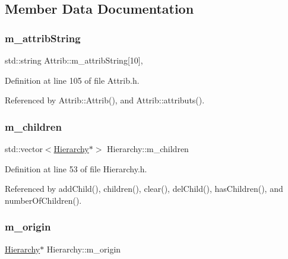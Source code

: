 \subsection{Member Data Documentation}
\mbox{\label{classAttrib_a3414521d7a82476e874b25a5407b5e63}} 
\subsubsection{\texorpdfstring{m\+\_\+attrib\+String}{m\_attribString}}
{\footnotesize\ttfamily std\+::string Attrib\+::m\+\_\+attrib\+String\mbox{[}10\mbox{]}\hspace{0.3cm}{\ttfamily [protected]}, {\ttfamily [inherited]}}



Definition at line 105 of file Attrib.\+h.



Referenced by Attrib\+::\+Attrib(), and Attrib\+::attributs().

\mbox{\label{classHierarchy_a038816763941fd4a930504917f60483b}} 
\subsubsection{\texorpdfstring{m\+\_\+children}{m\_children}}
{\footnotesize\ttfamily std\+::vector$<$\hyperlink{classHierarchy}{Hierarchy}$\ast$$>$ Hierarchy\+::m\+\_\+children\hspace{0.3cm}{\ttfamily [private]}}



Definition at line 53 of file Hierarchy.\+h.



Referenced by add\+Child(), children(), clear(), del\+Child(), has\+Children(), and number\+Of\+Children().

\mbox{\label{classHierarchy_a16c73e557d3a7c156ffb5dc4102d148e}} 
\subsubsection{\texorpdfstring{m\+\_\+origin}{m\_origin}}
{\footnotesize\ttfamily \hyperlink{classHierarchy}{Hierarchy}$\ast$ Hierarchy\+::m\+\_\+origin\hspace{0.3cm}{\ttfamily [private]}}



